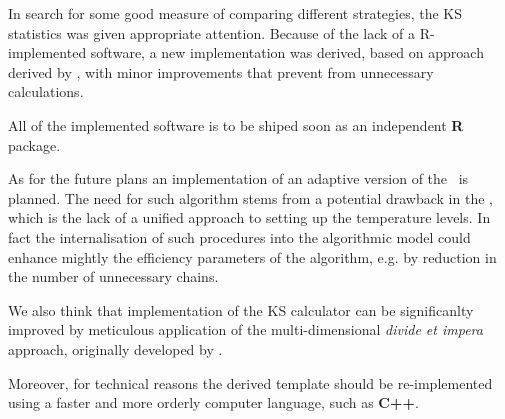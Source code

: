 In search for some good measure of comparing different strategies, the \textsc{KS} statistics was given appropriate attention. Because of the lack of a R-implemented software, a new implementation was derived, based on approach derived by \citet{NiVingron}, with minor improvements that prevent from unnecessary calculations.

All of the implemented software is to be shiped soon as an independent \textbf{R} package.           

As for the future plans an implementation of an adaptive version of the \PT\, is planned. The need for such algorithm stems from a potential drawback in the \PT, which is the lack of a unified approach to setting up the temperature levels. In fact the internalisation of such procedures into the algorithmic model could enhance mightly the efficiency parameters of the algorithm, e.g. by reduction in the number of unnecessary chains. 

We also think that implementation of the \textsc{KS} calculator can be significanlty improved by meticulous application of the multi-dimensional {\it divide et impera} approach, originally developed by \citet{Jon}.  

Moreover, for technical reasons the derived template should be re-implemented using a faster and more orderly computer language, such as \textbf{C++}.